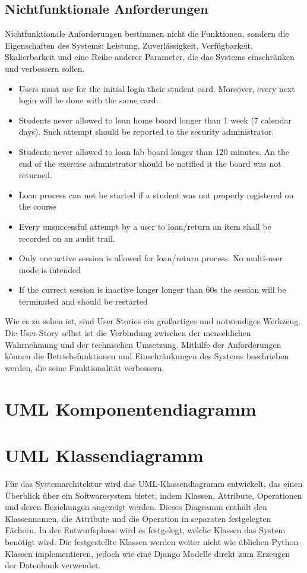 \subsection{Nichtfunktionale Anforderungen}
Nichtfunktionale Anforderungen bestimmen nicht die Funktionen, sondern die Eigenschaften des Systems: Leistung, Zuverlässigkeit, Verfügbarkeit, Skalierbarkeit und eine Reihe anderer Parameter, die das Systems einschränken und verbessern sollen. 
\label{sec:design:req:non-func}
\begin{itemize}
	\itemsep-1.2em 
	\item Users must use for the initial login their student card. Moreover, every next login will be done with the same card. 
	\item Students never allowed to loan home board longer than 1 week (7 calendar days). Such attempt should be reported to the security administrator.
	\item Students never allowed to loan lab board longer than 120 minutes. An the end of the exercise admnistrator should be notified it the board was not returned.
	\item Loan process can not be started if a student was not properly registered on the course
	\item Every unsuccessful attempt by a user to loan/return an item shall be recorded on an audit trail.
	\item Only one active session is allowed for loan/return process. No multi-user mode is intended
	\item If the currect session is inactive longer longer than 60s the session will be terminated and should be restarted
\end{itemize}

Wie es zu sehen ist, sind User Stories ein großartiges und notwendiges Werkzeug. Die User Story selbst ist die Verbindung zwischen der menschlichen Wahrnehmung und der technischen Umsetzung. Mithilfe der Anforderungen können die Betriebsfunktionen und Einschränkungen des Systems beschrieben werden, die seine Funktionalität verbessern.

\section{UML Komponentendiagramm}
\label{sec:design:uml_component}

\section{UML Klassendiagramm}
\label{sec:design:uml_class}
Für das Systemarchitektur wird das UML-Klassendiagramm entwickelt, das einen Überblick über ein Softwaresystem bietet, indem Klassen, Attribute, Operationen und deren Beziehungen angezeigt werden. Dieses Diagramm enthält den Klassennamen, die Attribute und die Operation in separaten festgelegten Fächern. In der Entwurfsphase wird es festgelegt, welche Klassen das System benötigt wird. Die festgestellte Klassen werden weiter nicht wie üblichen Python-Klassen implementieren, jedoch wie eine Django Modelle direkt zum Erzeugen der Datenbank verwendet. 

